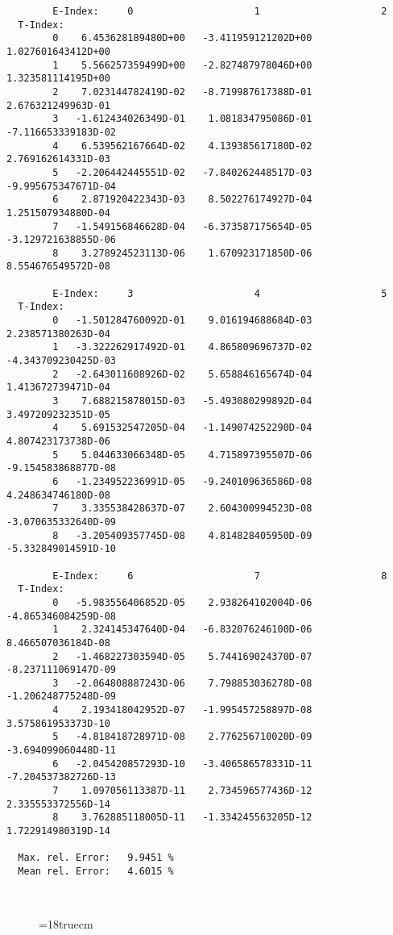 \begin{verbatim}
        E-Index:     0                     1                     2
  T-Index:
        0    6.453628189480D+00   -3.411959121202D+00    1.027601643412D+00
        1    5.566257359499D+00   -2.827487978046D+00    1.323581114195D+00
        2    7.023144782419D-02   -8.719987617388D-01    2.676321249963D-01
        3   -1.612434026349D-01    1.081834795086D-01   -7.116653339183D-02
        4    6.539562167664D-02    4.139385617180D-02    2.769162614331D-03
        5   -2.206442445551D-02   -7.840262448517D-03   -9.995675347671D-04
        6    2.871920422343D-03    8.502276174927D-04    1.251507934880D-04
        7   -1.549156846628D-04   -6.373587175654D-05   -3.129721638855D-06
        8    3.278924523113D-06    1.670923171850D-06    8.554676549572D-08

        E-Index:     3                     4                     5
  T-Index:
        0   -1.501284760092D-01    9.016194688684D-03    2.238571380263D-04
        1   -3.322262917492D-01    4.865809696737D-02   -4.343709230425D-03
        2   -2.643011608926D-02    5.658846165674D-04    1.413672739471D-04
        3    7.688215878015D-03   -5.493080299892D-04    3.497209232351D-05
        4    5.691532547205D-04   -1.149074252290D-04    4.807423173738D-06
        5    5.044633066348D-05    4.715897395507D-06   -9.154583868877D-08
        6   -1.234952236991D-05   -9.240109636586D-08    4.248634746180D-08
        7    3.335538428637D-07    2.604300994523D-08   -3.070635332640D-09
        8   -3.205409357745D-08    4.814828405950D-09   -5.332849014591D-10

        E-Index:     6                     7                     8
  T-Index:
        0   -5.983556406852D-05    2.938264102004D-06   -4.865346084259D-08
        1    2.324145347640D-04   -6.832076246100D-06    8.466507036184D-08
        2   -1.468227303594D-05    5.744169024370D-07   -8.237111069147D-09
        3   -2.064808887243D-06    7.798853036278D-08   -1.206248775248D-09
        4    2.193418042952D-07   -1.995457258897D-08    3.575861953373D-10
        5   -4.818418728971D-08    2.776256710020D-09   -3.694099060448D-11
        6   -2.045420857293D-10   -3.406586578331D-11   -7.204537382726D-13
        7    1.097056113387D-11    2.734596577436D-12    2.335553372556D-14
        8    3.762885118005D-11   -1.334245563205D-12    1.722914980319D-14

  Max. rel. Error:   9.9451 %
  Mean rel. Error:   4.6015 %



\end{verbatim}
\begin{figure} \label{2.3.6lr1}
\epsfxsize=18truecm
\end{figure}
\newpage

